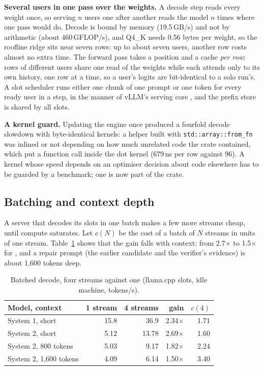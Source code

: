 \textbf{Several users in one pass over the weights.} A decode step reads
every weight once, so serving $n$ users one after another reads the model $n$
times where one pass would do. Decode is bound by memory (19.5\,GB/s) and not
by arithmetic (about 460\,GFLOP/s), and Q4\_K needs 0.56 bytes per weight, so
the roofline ridge sits near seven rows: up to about seven users, another row
costs almost no extra time. The forward pass takes a position and a cache
\emph{per row}; rows of different users share one read of the weights while
each attends only to its own history, one row at a time, so a user's logits
are bit-identical to a solo run's. A slot scheduler runs either one chunk of
one prompt or one token for every ready user in a step, in the manner of
vLLM's serving core \cite{kwon2023pagedattention}, and the prefix store is
shared by all slots.

\textbf{A kernel guard.} Updating the engine once produced a fourfold decode
slowdown with byte-identical kernels: a helper built with
\texttt{std::array::from\_fn} was inlined or not depending on how much
unrelated code the crate contained, which put a function call inside the dot
kernel (679\,ns per row against 96). A kernel whose speed depends on an
optimiser decision about code elsewhere has to be guarded by a benchmark; one
is now part of the crate.

\subsection{Batching and context depth}
\label{sec:batching}
A server that decodes its slots in one batch makes a few more streams cheap,
until compute saturates. Let $c(N)$ be the cost of a batch of $N$ streams in
units of one stream. Table~\ref{tab:batch} shows that the gain falls with
context: from 2.7$\times$ to 1.5$\times$ for \Stwo, and a repair prompt (the
earlier candidate and the verifier's evidence) is about 1{,}600 tokens deep.

\begin{table}[t]
\centering
\caption{Batched decode, four streams against one (llama.cpp slots, idle machine, tokens/s).}
\label{tab:batch}
\scriptsize
\begin{tabular}{@{}lrrrr@{}}
\toprule
Model, context & 1 stream & 4 streams & gain & $c(4)$ \\
\midrule
System 1, short & 15.8 & 36.9 & 2.34$\times$ & 1.71 \\
System 2, short & 5.12 & 13.78 & 2.69$\times$ & 1.60 \\
System 2, 800 tokens & 5.03 & 9.17 & 1.82$\times$ & 2.24 \\
System 2, 1,600 tokens & 4.09 & 6.14 & 1.50$\times$ & 3.40 \\
\bottomrule
\end{tabular}
\end{table}

